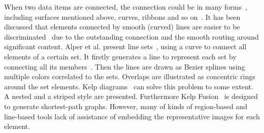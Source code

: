 When two data items are connected,
the connection could be in many forms~\cite{palmer1994rethinking}, including surfaces mentioned above,
curves, ribbons and so on~\cite{steinberger2011context}.
It has been discussed that elements connected by smooth (curved) lines are
easier to be discriminated~\cite{hoffmann2008evaluating} due to the outstanding
connection and the smooth routing around significant content.
Alper et al. present line sets~\cite{alper2011design},
using a curve to connect all elements of a certain set.
It firstly generates a line to represent each set by
connecting all its members~\cite{lin1973effective}.
Then the lines are drawn as Bezier splines using multiple colors correlated to the sets.
Overlaps are illustrated as concentric rings around the set elements.
Kelp diagrams~\cite{dinkla2012kelp} can solve this problem to some extent.
A nested and a striped style are presented.
Furthermore Kelp Fusion~\cite{meulemans2013kelpfusion} is designed
to generate shortest-path graphs.
However, many of kinds of region-based and line-based tools lack of assistance of embedding the
representative images for each element.

